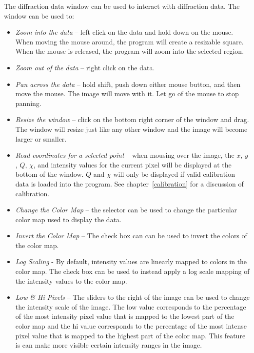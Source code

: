 The diffraction data window can be used to interact with 
diffraction data. The window can be used to:
\begin{itemize}
    \item {\em Zoom into the data} -- left click on the data and 
    hold down on the mouse. When moving the mouse around, the
    program will create a resizable square. When the mouse is released,
    the program will zoom into the selected region.
    \item {\em Zoom out of the data} -- right click on
    the data.
    \item {\em Pan across the data} -- hold shift, push down either mouse
    button, and then move the mouse. The image will move 
    with it. Let go of the mouse to stop panning.
    \item {\em Resize the window} -- click on the bottom right corner of
    the window and drag. The window will resize just like any
    other window and the image will become larger or smaller.  
    \item {\em Read coordinates for a selected point} -- when mousing
    over the image, the $x$, $y$, $Q$, $\chi$, and intensity
    values for the current pixel will be displayed at the bottom of the
    window. $Q$ and $\chi$ will only be displayed if valid calibration
    data is loaded into the program. See chapter~\ref{calibration} for
    a discussion of calibration.
    \item {\em Change the Color Map} -- the  selector 
    can be used to change the particular color map used to display the 
    data.
    \item {\em Invert the Color Map} -- The  check box can 
    can be used to invert the colors of the color map.
    \item {\em Log Scaling} - By default, intensity values are linearly 
    mapped to colors in the color map. The  check box 
    can be used to instead apply a log scale mapping of the intensity 
    values to the color map.
    \item {\em Low \& Hi Pixels} -- The sliders to the right of the 
    image can be used to change the intensity scale of the
    image. The low value corresponds to the percentage of
    the most intensity pixel value that is mapped to the lowest part of
    the color map and the hi value corresponds to the percentage of
    the most intense pixel value that is mapped to the highest 
    part of the color map.  This feature is can make more
    visible certain intensity ranges in the image.

\end{itemize}
